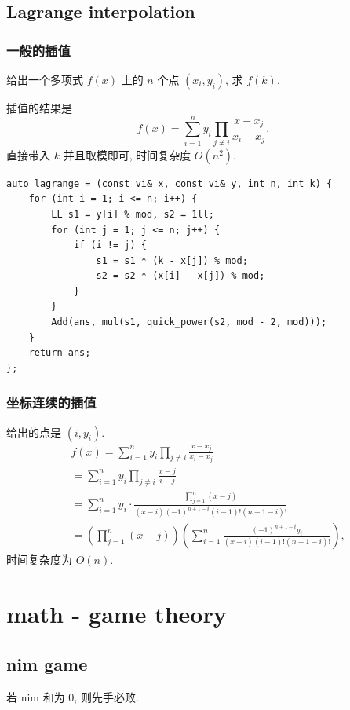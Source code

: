 \documentclass[UTF8, a4paper, titlepage, twoside]{ctexart}
\begin{document}
\subsection*{ Lagrange interpolation }

\subsubsection*{ 一般的插值 }

给出一个多项式 \(f(x)\) 上的 \(n\) 个点 \((x_i, y_i)\), 求 \(f(k)\).

插值的结果是
\[
    f(x) = \sum_{i=1}^{n} y_i \prod_{j \neq i} \frac{x - x_j}{x_i - x_j},
\]
直接带入 \(k\) 并且取模即可, 时间复杂度 $O(n^2)$.

\begin{lstlisting}[style=cpp]
auto lagrange = (const vi& x, const vi& y, int n, int k) {
    for (int i = 1; i <= n; i++) {
        LL s1 = y[i] % mod, s2 = 1ll;
        for (int j = 1; j <= n; j++) {
            if (i != j) {
                s1 = s1 * (k - x[j]) % mod;
                s2 = s2 * (x[i] - x[j]) % mod;
            }
        }
        Add(ans, mul(s1, quick_power(s2, mod - 2, mod)));
    }
    return ans;
};
\end{lstlisting}

\subsubsection*{ 坐标连续的插值 }

给出的点是 $(i, y_i)$.
\[
    \begin{aligned}
         & f(x) = \sum_{i=1}^{n} y_i \prod_{j \neq i} \frac{x - x_j}{x_i - x_j}                                          \\
         & = \sum_{i=1}^{n} y_i \prod_{j \neq i} \frac{x - j}{i - j}                                                     \\
         & = \sum_{i=1}^{n} y_i \cdot \frac{\prod\limits_{j=1}^n (x - j)}{(x - i) (-1)^{n+1-i}(i-1)!(n+1-i)!}            \\
         & = \left( \prod_{j=1}^n (x - j) \right) \left(\sum_{i=1}^n \frac{(-1)^{n+1-i}y_i}{(x-i)(i-1)!(n+1-i)!}\right),
    \end{aligned}
\]
时间复杂度为 \(O(n)\).

\newpage
\section{ math - game theory }
\subsection{ nim game }
若 nim 和为 0, 则先手必败.
\end{document}
